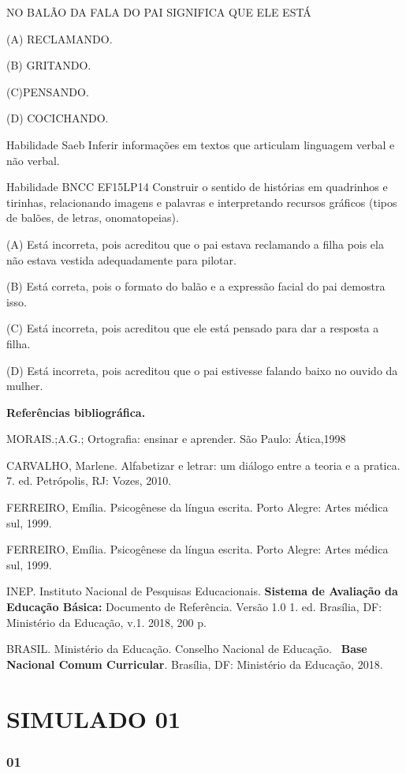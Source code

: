 NO BALÃO DA FALA DO PAI SIGNIFICA QUE ELE ESTÁ

(A) RECLAMANDO.

(B) GRITANDO.

(C)PENSANDO.

(D) COCICHANDO.

Habilidade Saeb Inferir informações em textos que articulam linguagem
verbal e não verbal.

Habilidade BNCC EF15LP14 Construir o sentido de histórias em quadrinhos
e tirinhas, relacionando imagens e palavras e interpretando recursos
gráficos (tipos de balões, de letras, onomatopeias).

(A) Está incorreta, pois acreditou que o pai estava reclamando a filha
pois ela não estava vestida adequadamente para pilotar.

(B) Está correta, pois o formato do balão e a expressão facial do pai
demostra isso.

(C) Está incorreta, pois acreditou que ele está pensado para dar a
resposta a filha.

(D) Está incorreta, pois acreditou que o pai estivesse falando baixo no
ouvido da mulher.

\textbf{Referências bibliográfica.}

MORAIS.;A.G.; Ortografia: ensinar e aprender. São Paulo: Ática,1998

CARVALHO, Marlene. Alfabetizar e letrar: um diálogo entre a teoria e a
pratica. 7. ed. Petrópolis, RJ: Vozes, 2010.

FERREIRO, Emília. Psicogênese da língua escrita. Porto Alegre: Artes
médica sul, 1999.

FERREIRO, Emília. Psicogênese da língua escrita. Porto Alegre: Artes
médica sul, 1999.

INEP. Instituto Nacional de Pesquisas Educacionais. \textbf{Sistema de
Avaliação da Educação Básica:} Documento de Referência. Versão 1.0 1.
ed. Brasília, DF: Ministério da Educação, v.1. 2018, 200 p.

BRASIL. Ministério da Educação. Conselho Nacional de Educação.~
\textbf{Base Nacional Comum Curricular}. Brasília, DF: Ministério da
Educação, 2018.

\section{SIMULADO 01}\label{simulado-01}

\subsubsection{01}\label{section-94}

